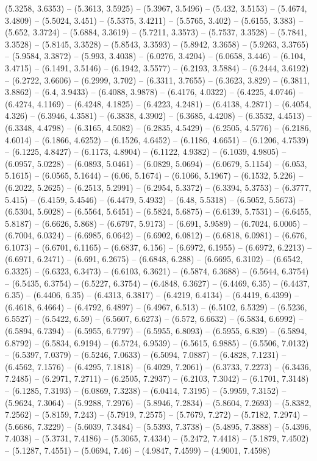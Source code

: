 (5.3258, 3.6353) -- (5.3613, 3.5925) -- (5.3967, 3.5496) -- (5.432, 3.5153) -- (5.4674, 3.4809) -- (5.5024, 3.451) -- (5.5375, 3.4211) -- (5.5765, 3.402) -- (5.6155, 3.383) -- (5.652, 3.3724) -- (5.6884, 3.3619) -- (5.7211, 3.3573) -- (5.7537, 3.3528) -- (5.7841, 3.3528) -- (5.8145, 3.3528) -- (5.8543, 3.3593) -- (5.8942, 3.3658) -- (5.9263, 3.3765) -- (5.9584, 3.3872) -- (5.993, 3.4038) -- (6.0276, 3.4204) -- (6.0658, 3.446) -- (6.104, 3.4715) -- (6.1491, 3.5146) -- (6.1942, 3.5577) -- (6.2193, 3.5884) -- (6.2444, 3.6192) -- (6.2722, 3.6606) -- (6.2999, 3.702) -- (6.3311, 3.7655) -- (6.3623, 3.829) -- (6.3811, 3.8862) -- (6.4, 3.9433) -- (6.4088, 3.9878) -- (6.4176, 4.0322) -- (6.4225, 4.0746) -- (6.4274, 4.1169) -- (6.4248, 4.1825) -- (6.4223, 4.2481) -- (6.4138, 4.2871) -- (6.4054, 4.326) -- (6.3946, 4.3581) -- (6.3838, 4.3902) -- (6.3685, 4.4208) -- (6.3532, 4.4513) -- (6.3348, 4.4798) -- (6.3165, 4.5082) -- (6.2835, 4.5429) -- (6.2505, 4.5776) -- (6.2186, 4.6014) -- (6.1866, 4.6252) -- (6.1526, 4.6452) -- (6.1186, 4.6651) -- (6.1206, 4.7539) -- (6.1225, 4.8427) -- (6.1173, 4.8904) -- (6.1122, 4.9382) -- (6.1039, 4.9805) -- (6.0957, 5.0228) -- (6.0893, 5.0461) -- (6.0829, 5.0694) -- (6.0679, 5.1154) -- (6.053, 5.1615) -- (6.0565, 5.1644) -- (6.06, 5.1674) -- (6.1066, 5.1967) -- (6.1532, 5.226) -- (6.2022, 5.2625) -- (6.2513, 5.2991) -- (6.2954, 5.3372) -- (6.3394, 5.3753) -- (6.3777, 5.415) -- (6.4159, 5.4546) -- (6.4479, 5.4932) -- (6.48, 5.5318) -- (6.5052, 5.5673) -- (6.5304, 5.6028) -- (6.5564, 5.6451) -- (6.5824, 5.6875) -- (6.6139, 5.7531) -- (6.6455, 5.8187) -- (6.6626, 5.868) -- (6.6797, 5.9173) -- (6.691, 5.9589) -- (6.7024, 6.0005) -- (6.7004, 6.0324) -- (6.6985, 6.0642) -- (6.6902, 6.0812) -- (6.6818, 6.0981) -- (6.676, 6.1073) -- (6.6701, 6.1165) -- (6.6837, 6.156) -- (6.6972, 6.1955) -- (6.6972, 6.2213) -- (6.6971, 6.2471) -- (6.691, 6.2675) -- (6.6848, 6.288) -- (6.6695, 6.3102) -- (6.6542, 6.3325) -- (6.6323, 6.3473) -- (6.6103, 6.3621) -- (6.5874, 6.3688) -- (6.5644, 6.3754) -- (6.5435, 6.3754) -- (6.5227, 6.3754) -- (6.4848, 6.3627) -- (6.4469, 6.35) -- (6.4437, 6.35) -- (6.4406, 6.35) -- (6.4313, 6.3817) -- (6.4219, 6.4134) -- (6.4419, 6.4399) -- (6.4618, 6.4664) -- (6.4792, 6.4897) -- (6.4967, 6.513) -- (6.5102, 6.5329) -- (6.5236, 6.5527) -- (6.5422, 6.59) -- (6.5607, 6.6273) -- (6.572, 6.6632) -- (6.5834, 6.6992) -- (6.5894, 6.7394) -- (6.5955, 6.7797) -- (6.5955, 6.8093) -- (6.5955, 6.839) -- (6.5894, 6.8792) -- (6.5834, 6.9194) -- (6.5724, 6.9539) -- (6.5615, 6.9885) -- (6.5506, 7.0132) -- (6.5397, 7.0379) -- (6.5246, 7.0633) -- (6.5094, 7.0887) -- (6.4828, 7.1231) -- (6.4562, 7.1576) -- (6.4295, 7.1818) -- (6.4029, 7.2061) -- (6.3733, 7.2273) -- (6.3436, 7.2485) -- (6.2971, 7.2711) -- (6.2505, 7.2937) -- (6.2103, 7.3042) -- (6.1701, 7.3148) -- (6.1285, 7.3193) -- (6.0869, 7.3238) -- (6.0414, 7.3195) -- (5.9959, 7.3152) -- (5.9624, 7.3064) -- (5.9288, 7.2976) -- (5.8946, 7.2834) -- (5.8604, 7.2693) -- (5.8382, 7.2562) -- (5.8159, 7.243) -- (5.7919, 7.2575) -- (5.7679, 7.272) -- (5.7182, 7.2974) -- (5.6686, 7.3229) -- (5.6039, 7.3484) -- (5.5393, 7.3738) -- (5.4895, 7.3888) -- (5.4396, 7.4038) -- (5.3731, 7.4186) -- (5.3065, 7.4334) -- (5.2472, 7.4418) -- (5.1879, 7.4502) -- (5.1287, 7.4551) -- (5.0694, 7.46) -- (4.9847, 7.4599) -- (4.9001, 7.4598) 